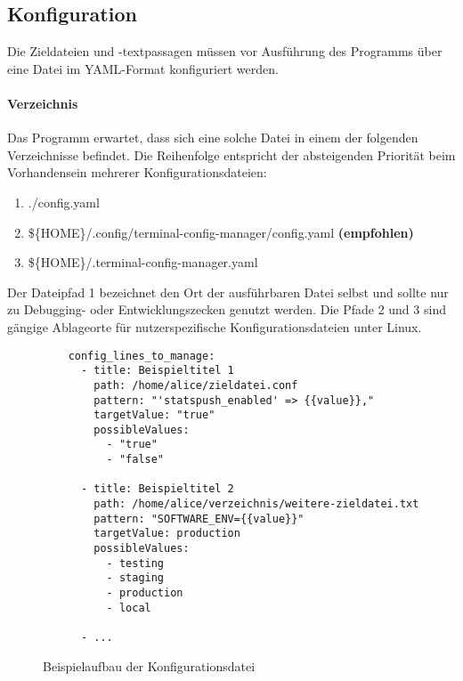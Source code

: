 \subsection{Konfiguration}
Die Zieldateien und -textpassagen müssen vor Ausführung des Programms
über eine Datei im YAML-Format \cite{yaml} konfiguriert werden.

\paragraph{Verzeichnis}
Das Programm erwartet, dass sich eine solche Datei in einem der folgenden
Verzeichnisse befindet. Die Reihenfolge entspricht der absteigenden Priorität
beim Vorhandensein mehrerer Konfigurationsdateien:

\begin{enumerate}
  \item ./config.yaml
  \item \$\{HOME\}/.config/terminal-config-manager/config.yaml \textbf{(empfohlen)}
  \item \$\{HOME\}/.terminal-config-manager.yaml
\end{enumerate}

Der Dateipfad 1 bezeichnet den Ort der ausführbaren Datei selbst und sollte nur
zu Debugging- oder Entwicklungszecken genutzt werden. Die Pfade 2 und 3 sind
gängige Ablageorte für nutzerspezifische Konfigurationsdateien unter Linux.

\newenvironment{code}{\captionsetup{type=listing}}{}

\begin{figure}
  \caption{Beispielaufbau der Konfigurationsdatei}
  \label{fig:sample-config}
  \begin{verbatim}
    config_lines_to_manage:
      - title: Beispieltitel 1
        path: /home/alice/zieldatei.conf
        pattern: "'statspush_enabled' => {{value}},"
        targetValue: "true"
        possibleValues:
          - "true"
          - "false"

      - title: Beispieltitel 2
        path: /home/alice/verzeichnis/weitere-zieldatei.txt
        pattern: "SOFTWARE_ENV={{value}}"
        targetValue: production
        possibleValues:
          - testing
          - staging
          - production
          - local

      - ...
  \end{verbatim}
\end{figure}

